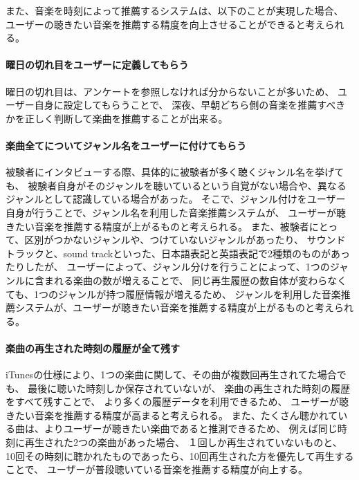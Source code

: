\documentclass[11pt, onecolumn]{jsarticle}
\begin{document}
\vspace{\Cvs} 
また、音楽を時刻によって推薦するシステムは、以下のことが実現した場合、
ユーザーの聴きたい音楽を推薦する精度を向上させることができると考えられる。
\paragraph{曜日の切れ目をユーザーに定義してもらう}
曜日の切れ目は、アンケートを参照しなければ分からないことが多いため、
ユーザー自身に設定してもらうことで、
深夜、早朝どちら側の音楽を推薦すべきかを正しく判断して楽曲を推薦することが出来る。

\paragraph{楽曲全てについてジャンル名をユーザーに付けてもらう}
被験者にインタビューする際、具体的に被験者が多く聴くジャンル名を挙げても、
被験者自身がそのジャンルを聴いているという自覚がない場合や、異なるジャンルとして認識している場合があった。
そこで、ジャンル付けをユーザー自身が行うことで、ジャンル名を利用した音楽推薦システムが、
ユーザーが聴きたい音楽を推薦する精度が上がるものと考えられる。
また、被験者にとって、区別がつかないジャンルや、つけていないジャンルがあったり、
サウンドトラックと、sound trackといった、日本語表記と英語表記で2種類のものがあったりしたが、
ユーザーによって、ジャンル分けを行うことによって、1つのジャンルに含まれる楽曲の数が増えることで、
同じ再生履歴の数自体が変わらなくても、1つのジャンルが持つ履歴情報が増えるため、
ジャンルを利用した音楽推薦システムが、ユーザーが聴きたい音楽を推薦する精度が上がるものと考えられる。
\paragraph{楽曲の再生された時刻の履歴が全て残す}
iTunesの仕様により、1つの楽曲に関して、その曲が複数回再生されてた場合でも、
最後に聴いた時刻しか保存されていないが、
楽曲の再生された時刻の履歴をすべて残すことで、
より多くの履歴データを利用できるため、
ユーザーが聴きたい音楽を推薦する精度が高まると考えられる。
また、たくさん聴かれている曲は、よりユーザーが聴きたい楽曲であると推測できるため、
例えば同じ時刻に再生された2つの楽曲があった場合、
１回しか再生されていないものと、
10回その時刻に聴かれたものであったら、10回再生された方を優先して再生することで、
ユーザーが普段聴いている音楽を推薦する精度が向上する。

\end{document}
